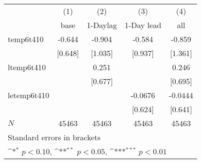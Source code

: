 {
\def\sym#1{\ifmmode^{#1}\else\(^{#1}\)\fi}
\begin{tabular}{l*{4}{c}}
\hline\hline
            &\multicolumn{1}{c}{(1)}&\multicolumn{1}{c}{(2)}&\multicolumn{1}{c}{(3)}&\multicolumn{1}{c}{(4)}\\
            &\multicolumn{1}{c}{base}&\multicolumn{1}{c}{1-Daylag}&\multicolumn{1}{c}{1-Day lead}&\multicolumn{1}{c}{all}\\
\hline
temp6t410   &      -0.644         &      -0.904         &      -0.584         &      -0.859         \\
            &     [0.648]         &     [1.035]         &     [0.937]         &     [1.361]         \\
[1em]
ltemp6t410  &                     &       0.251         &                     &       0.246         \\
            &                     &     [0.677]         &                     &     [0.695]         \\
[1em]
letemp6t410 &                     &                     &     -0.0676         &     -0.0444         \\
            &                     &                     &     [0.624]         &     [0.641]         \\
\hline
\(N\)       &       45463         &       45463         &       45463         &       45463         \\
\hline\hline
\multicolumn{5}{l}{\footnotesize Standard errors in brackets}\\
\multicolumn{5}{l}{\footnotesize \sym{*} \(p<0.10\), \sym{**} \(p<0.05\), \sym{***} \(p<0.01\)}\\
\end{tabular}
}
